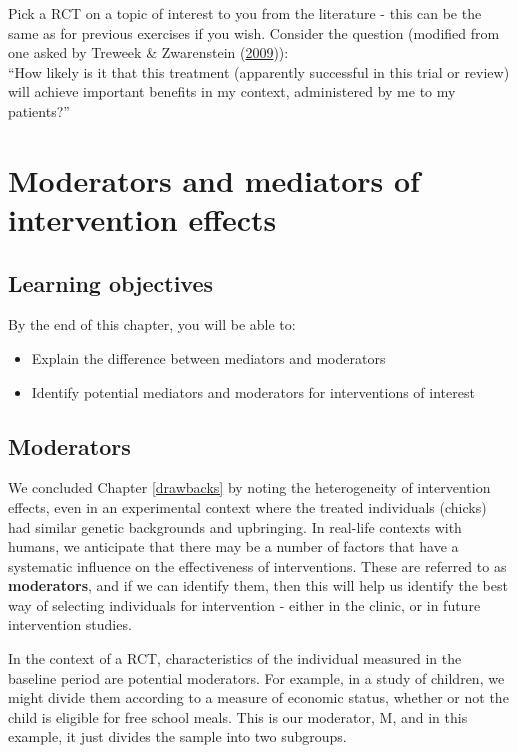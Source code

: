 \documentclass{krantz}
\begin{document}
Pick a RCT on a topic of interest to you from the literature - this can be the same as for previous exercises if you wish. Consider the question (modified from one asked by Treweek \& Zwarenstein (\protect\hyperlink{ref-treweek2009}{2009})):\\
``How likely is it that this treatment (apparently successful in this trial or review) will achieve important benefits in my context, administered by me to my patients?''

\hypertarget{mediators}{%
\chapter{Moderators and mediators of intervention effects}\label{mediators}}

\hypertarget{learning-objectives-13}{%
\section{Learning objectives}\label{learning-objectives-13}}

By the end of this chapter, you will be able to:

\begin{itemize}
\item
  Explain the difference between mediators and moderators
\item
  Identify potential mediators and moderators for interventions of interest
\end{itemize}

\hypertarget{moderators}{%
\section{Moderators}\label{moderators}}

We concluded Chapter \ref{drawbacks} by noting the heterogeneity of intervention effects, even in an experimental context where the treated individuals (chicks) had similar genetic backgrounds and upbringing. In real-life contexts with humans, we anticipate that there may be a number of factors that have a systematic influence on the effectiveness of interventions. These are referred to as \textbf{moderators}, and if we can identify them, then this will help us identify the best way of selecting individuals for intervention - either in the clinic, or in future intervention studies.

In the context of a RCT, characteristics of the individual measured in the baseline period are potential moderators. For example, in a study of children, we might divide them according to a measure of economic status, whether or not the child is eligible for free school meals. This is our moderator, M, and in this example, it just divides the sample into two subgroups.
\end{document}
